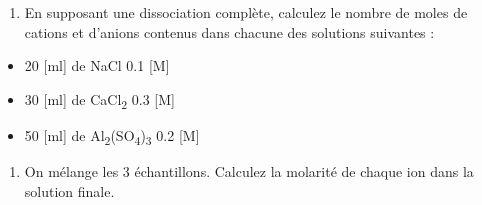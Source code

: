 \documentclass[
  11pt,
  a4paper,
  openany]{book}
\providecommand{\tightlist}{%
  \setlength{\itemsep}{0pt}\setlength{\parskip}{0pt}}
\begin{document}
\newpage

\begin{Exercise}

\begin{enumerate}
\def\labelenumi{\arabic{enumi}.}
\tightlist
\item
  En supposant une dissociation complète, calculez le nombre de moles de cations et d'anions contenus dans chacune des solutions suivantes :
\end{enumerate}

\begin{itemize}
\tightlist
\item
  20 {[}ml{]} de NaCl 0.1 {[}M{]}\\
\item
  30 {[}ml{]} de CaCl\textsubscript{2} 0.3 {[}M{]}\\
\item
  50 {[}ml{]} de Al\textsubscript{2}(SO\textsubscript{4})\textsubscript{3} 0.2 {[}M{]}\\
\end{itemize}

\begin{enumerate}
\def\labelenumi{\arabic{enumi}.}
\setcounter{enumi}{1}
\tightlist
\item
  On mélange les 3 échantillons. Calculez la molarité de chaque ion dans la solution finale.\\
\end{enumerate}

\end{Exercise}
\end{document}
